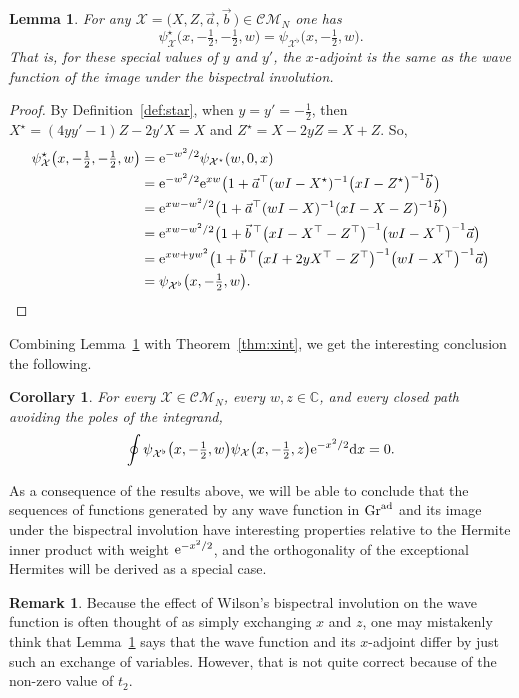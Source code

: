 \documentclass[10pt,a4paper]{amsart}
\numberwithin{equation}{section}
\newtheorem{Corollary}[Theorem]{Corollary}
\newtheorem{Lemma}[Theorem]{Lemma}
\theoremstyle{definition}
\newtheorem{Remark}[Theorem]{Remark}
\def\psistar{\psi^{\star}}
\def\X{\mathcal{X}}
\def\CM{\mathcal{C\!M}}
\begin{document}
\begin{Lemma}\label{lem:starbisp}
 For any $\X=\bigl(X,Z,\vec a,\vec b\,\bigr)\in\CM_N$ one has
 \[
 \psistar_{\X}\bigl(x,-\tfrac{1}{2},-\tfrac{1}{2},w\bigr)=\psi_{\X^{\flat}}\bigl(x,-\tfrac{1}{2},w\bigr).
 \]
 That is, for these special values of $y$ and $y'$, the $x$-adjoint
 is the same as the wave function of the image under the bispectral involution.
\end{Lemma}
\begin{proof}
By Definition~\ref{def:star}, when $y=y'=-\tfrac{1}{2}$, then
$X^{\star}=(4yy'-1)Z-2y'X=X$ and $Z^{\star}=X-2yZ=X+Z$. So,
\begin{align*}
\psistar_{\X}\bigl(x,-\tfrac{1}{2},-\tfrac{1}{2},w\bigr)&={\rm e}^{-w^2/2}\psi_{\X^{\star}}(w,0,x)\\
&={\rm e}^{-w^2/2}{\rm e}^{xw}\bigl(1+\vec
 a^{\top}(wI-X^{\star})^{-1}\bigl(xI-Z^{\star}\bigr)^{-1}\vec b\,\bigr)\\
&={\rm e}^{xw-w^2/2}\bigl(1+\vec
 a^{\top}(wI-X)^{-1}(xI-X-Z)^{-1}\vec b\,\bigr)\\
&={\rm e}^{xw-w^2/2}\bigl(1+\vec
 b^{\,\top}\bigl(xI-X^{\top}-Z^{\top}\bigr)^{-1}\bigl(wI-X^{\top}\bigr)^{-1}\vec a\bigr)\\
&={\rm e}^{xw+yw^2}\bigl(1+\vec b^{\,\top}\bigl(xI+2yX^{\top}-Z^{\top}\bigr)^{-1}\bigl(wI-X^{\top}\bigr)^{-1}\vec a\bigr)\\
&=
\psi_{\X^{\flat}}\bigl(x,-\tfrac{1}{2},w\bigr).\tag*{\qed}
\end{align*}\renewcommand{\qed}{}
\end{proof}

Combining Lemma~\ref{lem:starbisp} with Theorem~\ref{thm:xint}, we get
the interesting conclusion the following.
\begin{Corollary}
 For every $\X\in\CM_N$, every $w,z\in\mathbb{C}$, and every closed
 path avoiding the poles of the integrand,
 \[
 \oint \psi_{\X^{\flat}}\bigl(x,-\tfrac{1}{2},w\bigr)\psi_{\X}\bigl(x,-\tfrac{1}{2},z\bigr){\rm e}^{-x^2/2}{\rm d}x=0.
 \]
 \end{Corollary}


As a consequence of the results above, we will be able to conclude
that the sequences of functions generated by any wave function in
${\rm Gr}^{\rm ad}$ and its image under the bispectral involution have
interesting properties relative to the Hermite inner product with
weight ${\rm e}^{-x^2/2}$, and the orthogonality of the exceptional Hermites
will be derived as a special case.


\begin{Remark}
Because the effect of Wilson's bispectral involution on the wave
function is often thought of as simply exchanging $x$ and $z$, one may
mistakenly think that Lemma~\ref{lem:starbisp} says that the wave
function and its $x$-adjoint differ by just such an exchange of
variables. However, that is not quite correct because of the non-zero
value of $t_2$.
\end{Remark}
\end{document}
